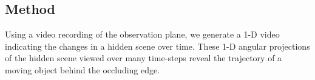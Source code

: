 


\vspace{-.1in}
\subsection{Method}
\label{sec:methods_edges2}

Using a video recording of the observation plane, we  generate a 1-D video indicating the changes in a hidden scene over time. These 1-D angular projections of the hidden scene viewed over many time-steps reveal
the trajectory of a moving object behind the occluding edge.

\vspace{-.1in}
